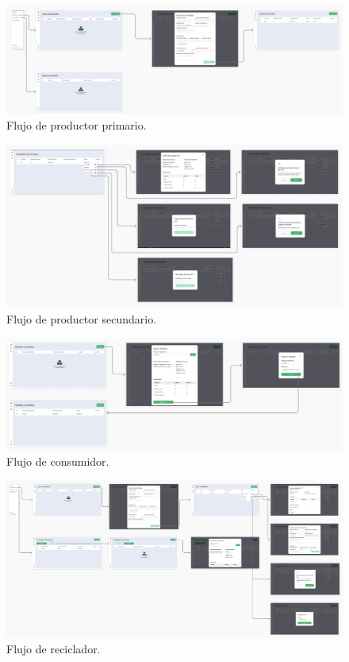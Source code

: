 \begin{figure}[!htb]
	\centering
	\includegraphics[width=\linewidth]{Figures/flow-primary-producer.png}
	\caption{Flujo de productor primario.}
  \label{fig:flow-primary-producer}
\end{figure}

\begin{figure}[!htb]
	\centering
	\includegraphics[width=\linewidth]{Figures/flow-secondary-producer.png}
	\caption{Flujo de productor secundario.}
  \label{fig:flow-secondary-producer}
\end{figure}

\begin{figure}[!htb]
	\centering
	\includegraphics[width=\linewidth]{Figures/flow-consumer.png}
	\caption{Flujo de consumidor.}
  \label{fig:flow-consumer}
\end{figure}

\begin{figure}[!htb]
	\centering
	\includegraphics[width=\linewidth]{Figures/flow-recycler.png}
	\caption{Flujo de reciclador.}
  \label{fig:flow-recycler}
\end{figure}

